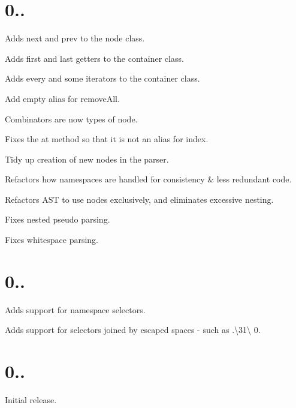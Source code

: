 \section*{0..}


\begin{DoxyItemize}
\item Adds {\ttfamily next} and {\ttfamily prev} to the node class.
\item Adds {\ttfamily first} and {\ttfamily last} getters to the container class.
\item Adds {\ttfamily every} and {\ttfamily some} iterators to the container class.
\item Add {\ttfamily empty} alias for {\ttfamily remove\+All}.
\item Combinators are now types of node.
\item Fixes the at method so that it is not an alias for {\ttfamily index}.
\item Tidy up creation of new nodes in the parser.
\item Refactors how namespaces are handled for consistency \& less redundant code.
\item Refactors A\+ST to use {\ttfamily nodes} exclusively, and eliminates excessive nesting.
\item Fixes nested pseudo parsing.
\item Fixes whitespace parsing.
\end{DoxyItemize}

\section*{0..}


\begin{DoxyItemize}
\item Adds support for namespace selectors.
\item Adds support for selectors joined by escaped spaces -\/ such as {\ttfamily .\textbackslash{}31\textbackslash{} 0}.
\end{DoxyItemize}

\section*{0..}


\begin{DoxyItemize}
\item Initial release. 
\end{DoxyItemize}